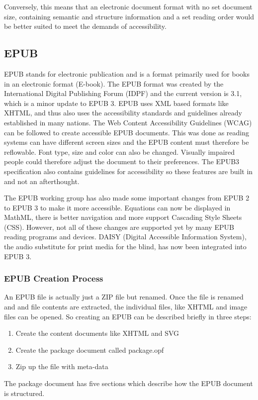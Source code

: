 \documentclass{article}
\begin{document}
Conversely, this means that an electronic document format with no set document size, containing semantic and structure information and a set reading order would be better suited to meet the demands of accessibility. 

\subsection{EPUB}
EPUB stands for electronic publication and is a format primarily used for books in an electronic format (E-book). The EPUB format was created by the International Digital Publishing Forum (IDPF) and the current version is 3.1, which is a minor update to EPUB 3. EPUB uses XML based formats like XHTML, and thus also uses the accessibility standards and guidelines already established in many nations. The Web Content Accessibility Guidelines (WCAG) can be followed to create accessible EPUB documents. This was done as reading systems can have different screen sizes and the EPUB content must therefore be reflowable. Font type, size and color can also be changed. Visually impaired people could therefore adjust the document to their preferences. The EPUB3 specification also contains guidelines for accessibility so these features are built in and not an afterthought. 

The EPUB working group has also made some important changes from EPUB 2 to EPUB 3  to make it more accessible. Equations can now be displayed in MathML, there is better navigation and more support Cascading Style Sheets (CSS). However, not all of these changes are supported yet by many EPUB reading programs and devices. DAISY (Digital Accessible Information System), the audio substitute for print media for the blind, has now been integrated into EPUB 3.

\subsubsection{EPUB Creation Process}
An EPUB file is actually just a ZIP file but renamed. Once the file is renamed and and file contents are extracted, the individual files, like XHTML and image files can be opened. So creating an EPUB can be described briefly in three steps:
\begin{enumerate}
	\item Create the content documents like XHTML and SVG
	\item Create the package document called package.opf
	\item Zip up the file with meta-data
\end{enumerate}
The package document has five sections which describe how the EPUB document is structured. 
\end{document}
